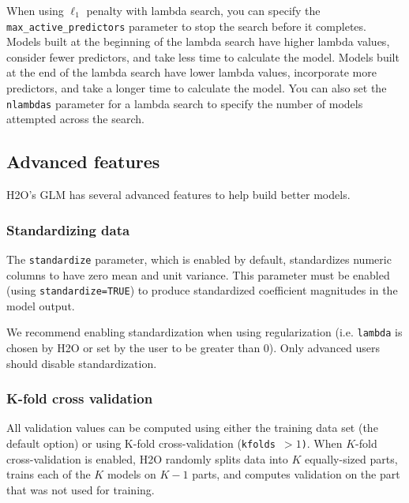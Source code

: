 When using  $\ell_1$ penalty with lambda search, you can specify the \texttt{max\_active\_predictors} parameter to stop
the search before it completes.  Models built at the beginning of the lambda search have higher lambda values, consider fewer predictors, and take less time to calculate the model.  Models built at the end of the lambda search have
lower lambda values, incorporate more predictors, and take a longer time to calculate the model. You can also set the \texttt{nlambdas} parameter for a lambda search to specify the number of models attempted across the search.

\bigskip
\waterExampleInR


\waterExampleInPython


\subsection{Advanced features}

H2O's GLM has several advanced features to help build better models.

\subsubsection{Standardizing data}

The \texttt{standardize} parameter, which is enabled by default, standardizes numeric columns to have zero mean and
unit variance.  This parameter must be enabled (using \texttt{standardize=TRUE}) to produce standardized coefficient magnitudes in the model output.

We recommend enabling standardization when using regularization (i.e. \texttt{lambda} is chosen by H2O or set by
the user to be greater than 0). Only advanced users should disable standardization.

\subsubsection{K-fold cross validation}

All validation values can be computed using either the training data set (the default option) or using K-fold
cross-validation (\texttt{kfolds $> 1$)}. When $K$-fold cross-validation is enabled, H2O randomly splits data into $K$
equally-sized parts, trains each of the $K$ models on $K-1$ parts, and computes validation on the part that was not
used for training.


